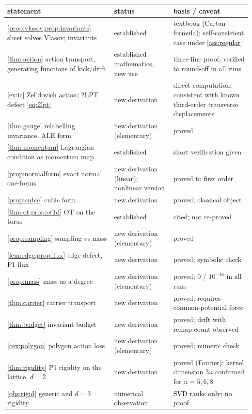 \begin{table}[h]\centering\footnotesize
\begin{tabular}{p{4.4cm}p{2.6cm}p{7.9cm}}\toprule
statement & status & basis / caveat\\\midrule
\cref{prop:vlasov,prop:invariants} sheet solves Vlasov; invariants & established & textbook (Cartan formula); self-consistent case under \cref{ass:regular}\\
\cref{thm:action} action transport, generating functions of kick/drift & established mathematics, new use & three-line proof; verified to round-off in all runs\\
\cref{ex:ic} Zel'dovich action; 2LPT defect \eqref{eq:2lpt} & new derivation & direct computation; consistent with known third-order transverse displacements\\
\cref{thm:gauge} relabelling invariance, ALE form & new derivation (elementary) & proved\\
\cref{thm:momentum} Lagrangian condition as momentum map & established \cite{Donaldson1999} & short verification given\\
\cref{prop:normalform} exact normal one-forms & new derivation (linear); nonlinear version \cite{Weinstein1971} & proved to first order\\
\cref{prop:cubic} cubic form & new derivation & proved; classical object\\
\cref{thm:ot,prop:ot1d} OT on the torus & established & cited; not re-proved\\
\cref{prop:sampling} sampling vs mass & new derivation (elementary) & proved\\
\cref{lem:edge,prop:flux} edge defect, P1 flux & new derivation & proved; symbolic check\\
\cref{prop:mass} mass as a degree & new derivation (elementary) & proved; $0$ / $10^{-16}$ in all runs\\
\cref{thm:carrier} carrier transport & new derivation & proved; requires common-potential force\\
\cref{thm:budget} invariant budget & new derivation & proved; drift with remap count observed\\
\cref{cex:polygon} polygon action loss & new derivation (elementary) & proved; numeric check\\
\cref{thm:rigidity} P1 rigidity on the lattice, $d=2$ & new derivation & proved (Fourier); kernel dimension $3n$ confirmed for $n=5,6,8$\\
\cref{obs:rigid} generic and $d=3$ rigidity & numerical observation & SVD ranks only; no proof\\

\end{tabular}
\end{table}
